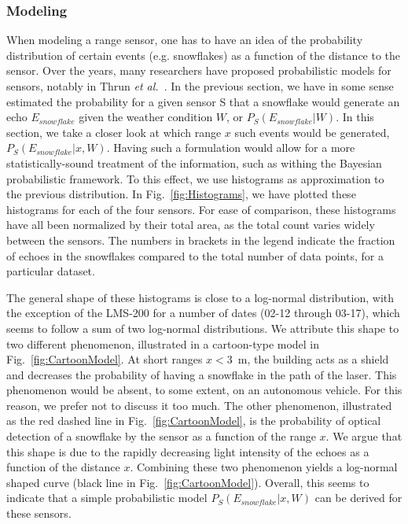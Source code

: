 \subsubsection{Modeling}
When modeling a range sensor, one has to have an idea of the probability distribution of certain events (e.g. snowflakes) as a function of the distance to the sensor. Over the years, many researchers have proposed probabilistic models for sensors, notably in Thrun \emph{et al.}~\cite{Thrun:2005:PR:1121596}. In the previous section, we have in some sense estimated the probability for a given sensor S that a snowflake would generate an echo $E_{snowflake}$ given the weather condition $W$, or $P_S(E_{snowflake}|W)$. In this section, we take a closer look at which range $x$ such events would be generated, $P_S(E_{snowflake}|x,W)$. Having such a formulation would allow for a more statistically-sound treatment of the information, such as withing the Bayesian probabilistic framework. To this effect, we use histograms as approximation to the previous distribution. In Fig.~\ref{fig:Histograms}, we have plotted these histograms for each of the four sensors. For ease of comparison, these histograms have all been normalized by their total area, as the total count varies widely between the sensors. The numbers in brackets in the legend indicate the fraction of echoes in the snowflakes compared to the total number of data points, for a particular dataset.


The general shape of these histograms is close to a log-normal distribution, with the exception of the LMS-200 for a number of dates (02-12 through 03-17), which seems to follow a sum of two log-normal distributions. We attribute this shape to two different phenomenon, illustrated in a cartoon-type model in Fig.~\ref{fig:CartoonModel}. At short ranges  $x<$\SI{3}{\meter}, the building acts as a shield and decreases the probability of having a snowflake in the path of the laser. This phenomenon would be absent, to some extent, on an autonomous vehicle. For this reason, we prefer not to discuss it too much. The other phenomenon, illustrated as the red dashed line in Fig.~\ref{fig:CartoonModel}, is the probability of optical detection of a snowflake by the sensor as a function of the range $x$. We argue that this shape is due to the rapidly decreasing light intensity of the echoes as a function of the distance $x$. Combining these two phenomenon yields a log-normal shaped curve (black line in Fig.~\ref{fig:CartoonModel}). Overall, this seems to indicate that a simple probabilistic model $P_S(E_{snowflake}|x,W)$ can be derived for these sensors. 

